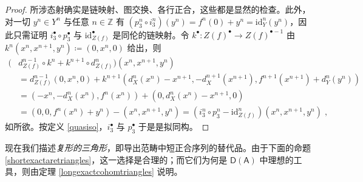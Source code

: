 \begin{proof}
	所涉态射确实是链映射、图交换、各行正合，这些都是显然的检查。此外，对一切 $y^n\in Y^n$ 与任意 $n\in\mathbb{Z}$ 有 $(p_3^n\circ i_3^n)(y^n)=f^n(0)+y^n=\text{id}_Y^n(y^n)$，因此只需证明 $i_3^\bullet\circ p_3^\bullet$ 与 $\text{id}_{Z(f)}^\bullet$ 是同伦的链映射。令 $k^\bullet:Z(f)^\bullet\rightarrow Z(f)^{\bullet-1}$ 由 $k^n(x^n,x^{n+1},y^n)\coloneqq (0,x^n,0)$ 给出，则
	\begin{align*}
		(&d_{Z(f)}^{n-1}\circ k^n + k^{n+1}\circ d_{Z(f)}^n)(x^n,x^{n+1},y^n) \\		
		&= d_{Z(f)}^{n-1}(0,x^n,0) + k^{n+1}(d_X^n(x^n)-x^{n+1},-d_X^{n+1}(x^{n+1}),f^{n+1}(x^{n+1})+d_Y^n(y^n)) \\
		&= (-x^n,-d_X^n(x^n),f^n(x^n)) + (0,d_X^n(x^n)-x^{n+1},0)\\
		&= (0,0,f^n(x^n)+y^n) - (x^n,x^{n+1},y^n)=(i_3^n\circ p_3^n-\text{id}_{Z(f)}^n)(x^n,x^{n+1},y^n)\;, 
	\end{align*}
	如所欲。按定义 \ref{quasiso}，$i_3^\bullet$ 与 $p_3^\bullet$ 于是是拟同构。 
\end{proof}

现在我们描述\textit{复形的三角形}，即导出范畴中短正合序列的替代品。由于下面的命题 \ref{shortexactaretriangles}，这一选择是合理的；而它们为何是 $\mathsf{D(A)}$ 中理想的工具，则由定理 \ref{longexactcohomtriangles} 说明。

